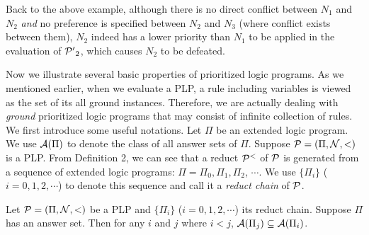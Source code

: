 \documentclass{tlp}
\begin{document}
Back to the above example, although there is no direct conflict between
$N_1$ and $N_2$ {\em and} no preference is specified between
$N_2$ and $N_3$ (where conflict exists between them), $N_2$ 
indeed has a lower priority than $N_1$ to be 
applied in the evaluation of ${\cal P'}_2$, which causes
$N_2$ to be defeated.

Now we illustrate several basic properties of
prioritized logic programs. As we mentioned earlier,
when we evaluate a
PLP, a rule including variables is viewed
as the set of its all ground instances.  
Therefore, we are actually dealing with {\em ground} 
prioritized logic programs that may consist of infinite collection 
of rules.
We first introduce some useful notations.
Let $\Pi$ be an extended logic program. We use ${\cal A}(\Pi)$ to
denote the class of all answer sets of $\Pi$.
Suppose ${\cal P}=(\Pi,{\cal N},<)$ is a PLP. From Definition 2, we can see
that a reduct ${\cal P}^{<}$ of ${\cal P}$ is generated
from a sequence of extended logic programs:
$\Pi=\Pi_{0}, \Pi_{1}, \Pi_{2}$, $\cdots$. We use 
$\{\Pi_{i}\}$ ($i=0, 1, 2, \cdots$) to denote this
sequence and call it
a {\em reduct chain} of ${\cal P}$.

\begin{proposition}
Let ${\cal P}=(\Pi,{\cal N},<)$ be a PLP and
$\{\Pi_{i}\}$ ($i=0, 1, 2, \cdots$) its reduct chain. Suppose
$\Pi$ has an answer set.  Then for any $i$ and $j$ where $i<j$,
${\cal A}(\Pi_{j})\subseteq {\cal A}(\Pi_{i})$.
\end{proposition}
\end{document}
